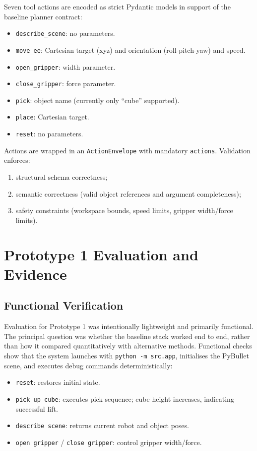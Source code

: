 \documentclass[12pt,a4paper]{article}
\begin{document}
Seven tool actions are encoded as strict Pydantic models in support of the baseline planner contract:
\begin{itemize}
\item \texttt{describe\_scene}: no parameters.
\item \texttt{move\_ee}: Cartesian target (xyz) and orientation (roll-pitch-yaw) and speed.
\item \texttt{open\_gripper}: width parameter.
\item \texttt{close\_gripper}: force parameter.
\item \texttt{pick}: object name (currently only ``cube'' supported).
\item \texttt{place}: Cartesian target.
\item \texttt{reset}: no parameters.
\end{itemize}

Actions are wrapped in an \texttt{ActionEnvelope} with mandatory \texttt{actions}. Validation enforces:
\begin{enumerate}
\item structural schema correctness;
\item semantic correctness (valid object references and argument completeness);
\item safety constraints (workspace bounds, speed limits, gripper width/force limits).
\end{enumerate}

\section{Prototype 1 Evaluation and Evidence}

\subsection{Functional Verification}

Evaluation for Prototype 1 was intentionally lightweight and primarily functional. The principal question was whether the baseline stack worked end to end, rather than how it compared quantitatively with alternative methods. Functional checks show that the system launches with \texttt{python -m src.app}, initialises the PyBullet scene, and executes debug commands deterministically:
\begin{itemize}
\item \texttt{reset}: restores initial state.
\item \texttt{pick up cube}: executes pick sequence; cube height increases, indicating successful lift.
\item \texttt{describe scene}: returns current robot and object poses.
\item \texttt{open gripper} / \texttt{close gripper}: control gripper width/force.
\end{itemize}
\end{document}
